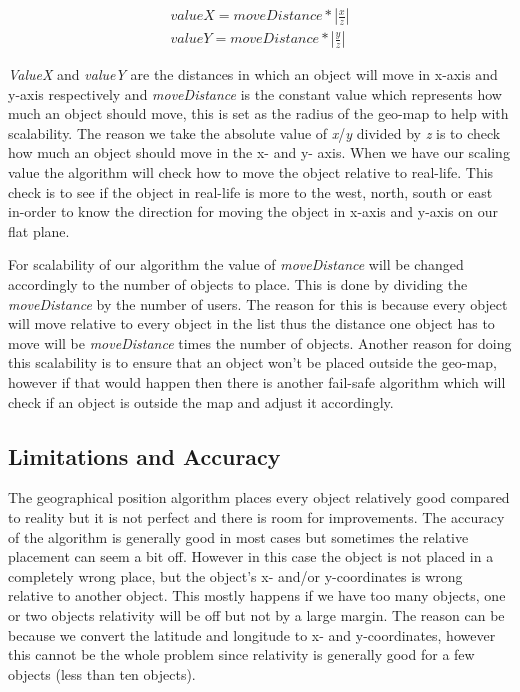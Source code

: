 \begin{align*}
\label{eq:2}
valueX = moveDistance*|\frac{x}{z}| \\
valueY = moveDistance*|\frac{y}{z}|
\end{align*}

\textit{ValueX} and \textit{valueY} are the distances in which an object will move in x-axis and y-axis respectively and \textit{moveDistance} is the constant value which represents how much an object should move, this is set as the radius of the geo-map to help with scalability. The reason we take the absolute value of \textit{x}/\textit{y} divided by \textit{z} is to check how much an object should move in the x- and y- axis. When we have our scaling value the algorithm will check how to move the object relative to real-life. This check is to see if the object in real-life is more to the west, north, south or east in-order to know the direction for moving the object in x-axis and y-axis on our flat plane.

For scalability of our algorithm the value of \textit{moveDistance} will be changed accordingly to the number of objects to place. This is done by dividing the \textit{moveDistance} by the number of users. The reason for this is because every object will move relative to every object in the list thus the distance one object has to move will be \textit{moveDistance} times the number of objects. Another reason for doing this scalability is to ensure that an object won't be placed outside the geo-map, however if that would happen then there is another fail-safe algorithm which will check if an object is outside the map and adjust it accordingly.

\subsection{Limitations and Accuracy}
\label{sec:limacc}

The geographical position algorithm places every object relatively good compared to reality but it is not perfect and there is room for improvements. The accuracy of the algorithm is generally good in most cases but sometimes the relative placement can seem a bit off. However in this case the object is not placed in a completely wrong place, but the object's x- and/or y-coordinates is wrong relative to another object. This mostly happens if we have too many objects, one or two objects relativity will be off but not by a large margin. The reason can be because we convert the latitude and longitude to x- and y-coordinates, however this cannot be the whole problem since relativity is generally good for a few objects (less than ten objects).


